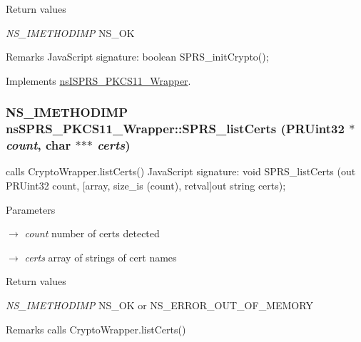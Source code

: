 \begin{DoxyRetVals}{Return values}
\item[{\em NS\_\-IMETHODIMP}]NS\_\-OK \end{DoxyRetVals}
\begin{DoxyRemark}{Remarks}
JavaScript signature: boolean SPRS\_\-initCrypto(); 
\end{DoxyRemark}


Implements \hyperlink{classnsISPRS__PKCS11__Wrapper}{nsISPRS\_\-PKCS11\_\-Wrapper}.\hypertarget{classnsSPRS__PKCS11__Wrapper_a41711bc3e37111e22ef0bf7eaacdbc13}{
\subsubsection[{SPRS\_\-listCerts}]{\setlength{\rightskip}{0pt plus 5cm}NS\_\-IMETHODIMP nsSPRS\_\-PKCS11\_\-Wrapper::SPRS\_\-listCerts (PRUint32 $\ast$ {\em count}, \/  char $\ast$$\ast$$\ast$ {\em certs})}}
\label{classnsSPRS__PKCS11__Wrapper_a41711bc3e37111e22ef0bf7eaacdbc13}


calls CryptoWrapper.listCerts() JavaScript signature: void SPRS\_\-listCerts (out PRUint32 count, \mbox{[}array, size\_\-is (count), retval\mbox{]}out string certs); 
\begin{DoxyParams}{Parameters}
\item[\mbox{$\rightarrow$} {\em count}]number of certs detected \item[\mbox{$\rightarrow$} {\em certs}]array of strings of cert names \end{DoxyParams}

\begin{DoxyRetVals}{Return values}
\item[{\em NS\_\-IMETHODIMP}]NS\_\-OK or NS\_\-ERROR\_\-OUT\_\-OF\_\-MEMORY \end{DoxyRetVals}
\begin{DoxyRemark}{Remarks}
calls CryptoWrapper.listCerts() 
\end{DoxyRemark}


